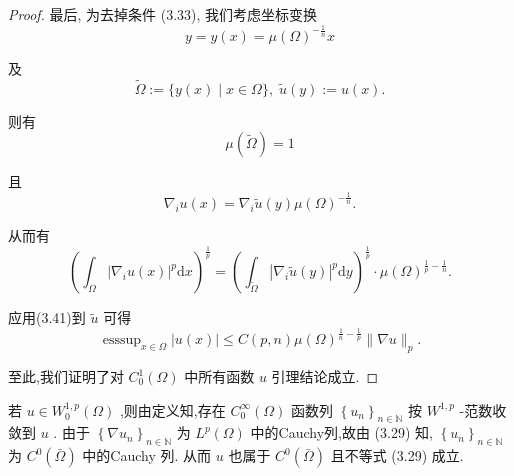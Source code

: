 \documentclass[lang=cn,newtx,10pt,scheme=chinese,thmcnt=chapter]{elegantbook}
\newcommand{\dif}{\mathrm{d}}
\begin{document}
\begin{proof}
最后, 为去掉条件 (3.33), 我们考虑坐标变换
\begin{equation*}
y = y\left( x\right)  = \mu {\left( \Omega \right) }^{-\frac{1}{n}}x
\end{equation*}

及
\begin{equation*}
\widetilde{\Omega } \mathrel{\text{ := }} \{ y\left( x\right)  \mid  x \in  \Omega \} ,\;\widetilde{u}\left( y\right)  \mathrel{\text{ := }} u\left( x\right) .
\end{equation*}

则有
\begin{equation*}
\mu \left( \widetilde{\Omega }\right)  = 1
\end{equation*}

且
\begin{equation*}
{\nabla }_{i}u\left( x\right)  = {\nabla }_{i}\widetilde{u}\left( y\right) \mu {\left( \Omega \right) }^{-\frac{1}{n}}.
\end{equation*}

从而有
\begin{equation*}
{\left( {\int }_{\Omega }{\left| {\nabla }_{i}u\left( x\right) \right| }^{p}\dif x\right) }^{\frac{1}{p}} = {\left( {\int }_{\widetilde{\Omega }}{\left| {\nabla }_{i}\widetilde{u}\left( y\right) \right| }^{p}\dif y\right) }^{\frac{1}{p}} \cdot  \mu {\left( \Omega \right) }^{\frac{1}{p} - \frac{1}{n}}.
\end{equation*}

应用(3.41)到 \(\widetilde{u}\) 可得
\begin{equation*}
{\operatorname{esssup}}_{x \in  \Omega }\left| {u\left( x\right) }\right|  \leqslant  C\left( {p,n}\right) \mu {\left( \Omega \right) }^{\frac{1}{n} - \frac{1}{p}}\parallel \nabla u{\parallel }_{p}.
\end{equation*}

至此,我们证明了对 \({C}_{0}^{1}\left( \Omega \right)\) 中所有函数 \(u\) 引理结论成立.
\end{proof}

若 \(u \in  {W}_{0}^{1,p}\left( \Omega \right)\) ,则由定义知,存在 \({C}_{0}^{\infty }\left( \Omega \right)\) 函数列 \({\left\{  {u}_{n}\right\}  }_{n \in  \mathbb{N}}\) 按 \({W}^{1,p}\) -范数收敛到 \(u\) . 由于 \({\left\{  \nabla {u}_{n}\right\}  }_{n \in  \mathbb{N}}\) 为 \({L}^{p}\left( \Omega \right)\) 中的Cauchy列,故由 (3.29) 知, \({\left\{  {u}_{n}\right\}  }_{n \in  \mathbb{N}}\) 为 \({C}^{0}\left( \bar{\Omega }\right)\) 中的Cauchy 列. 从而 \(u\) 也属于 \({C}^{0}\left( \bar{\Omega }\right)\) 且不等式 (3.29) 成立.
\end{document}
